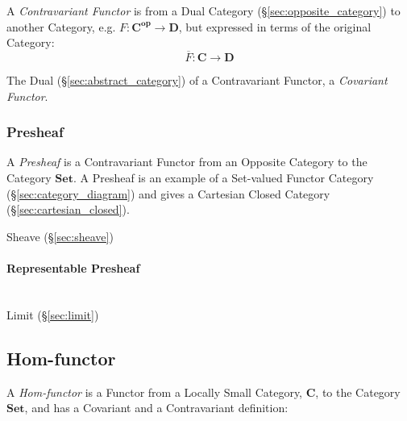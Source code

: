 A \emph{Contravariant Functor} is from a Dual Category
(\S\ref{sec:opposite_category}) to another Category, e.g. $F :
\mathbf{C^{op}} \rightarrow \mathbf{D}$, but expressed in terms of the
original Category:
\[
  \overline{F} : \mathbf{C} \rightarrow \mathbf{D}
\]

The Dual (\S\ref{sec:abstract_category}) of a Contravariant
Functor, a \emph{Covariant Functor}.



\subsubsection{Presheaf}\label{sec:presheaf}

A \emph{Presheaf} is a Contravariant Functor from an Opposite Category
to the Category $\mathbf{Set}$. A Presheaf is an example of a
Set-valued Functor Category (\S\ref{sec:category_diagram}) and gives a
Cartesian Closed Category (\S\ref{sec:cartesian_closed}).

Sheave (\S\ref{sec:sheave})



\paragraph{Representable Presheaf}\label{sec:representable_presheaf}
\hfill \\

Limit (\S\ref{sec:limit})



\subsection{Hom-functor}\label{sec:hom_functor}

A \emph{Hom-functor} is a Functor from a Locally Small Category,
$\mathbf{C}$, to the Category $\mathbf{Set}$, and has a Covariant and
a Contravariant definition:

